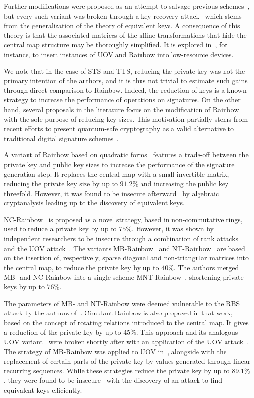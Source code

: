 \documentclass[english]{ufsc-thesis-rn46-2019/ufsc-thesis-rn46-2019}
\theoremstyle{definition}
\begin{document}
Further modifications were proposed as an attempt to salvage previous
schemes~\cite{Tsujii:201005}, but every such variant was broken through a key
recovery attack~\cite{Thomae:201207} which stems from the generalization of the
theory of equivalent keys. A consequence of this theory is that the associated
matrices of the affine transformations that hide the central map structure may
be thoroughly simplified. It is explored in~\cite{Czypek:201209}, for instance,
to insert instances of UOV and Rainbow into low-resource devices.

We note that in the case of STS and TTS, reducing the private key was not the
primary intention of the authors, and it is thus not trivial to estimate such
gains through direct comparison to Rainbow. Indeed, the reduction of keys is
a known strategy to increase the performance of operations on signatures. On
the other hand, several proposals in the literature focus on the modification
of Rainbow with the sole purpose of reducing key sizes. This motivation
partially stems from recent efforts to present quantum-safe cryptography as
a valid alternative to traditional digital signature
schemes~\cite{Bernstein:2008}.

A variant of Rainbow based on quadratic forms~\cite{Yasuda:201306} features
a trade-off between the private key and public key sizes to increase the
performance of the signature generation step. It replaces the central map with
a small invertible matrix, reducing the private key size by up to $91.2\%$ and
increasing the public key threefold. However, it was found to be insecure
afterward~\cite{Hashimoto:201601} by algebraic cryptanalysis leading up to the
discovery of equivalent keys.

NC-Rainbow~\cite{Yasuda:201202} is proposed as a novel strategy, based in
non-commutative rings, used to reduce a private key by up to $75\%$. However,
it was shown by independent researchers to be insecure through a combination of
rank attacks and the UOV attack~\cite{Thomae:201209,Hashimoto:201501}. The
variants MB-Rainbow~\cite{Yasuda:201305} and NT-Rainbow~\cite{Yasuda:201404}
are based on the insertion of, respectively, sparse diagonal and non-triangular
matrices into the central map, to reduce the private key by up to $40\%$. The
authors merged MB- and NC-Rainbow into a single scheme
MNT-Rainbow~\cite{Yasuda:201409}, shortening private keys by up to $76\%$.

The parameters of MB- and NT-Rainbow were deemed vulnerable to the RBS attack
by the authors of~\cite{Peng:201706}. Circulant Rainbow is also proposed in
that work, based on the concept of rotating relations introduced to the central
map. It gives a reduction of the private key by up to $45\%$. This approach and
its analogous UOV variant~\cite{Peng:201803} were broken shortly after with an
application of the UOV attack~\cite{Hashimoto:201903}. The strategy of
MB-Rainbow was applied to UOV in~\cite{Tan:201511}, alongside with the
replacement of certain parts of the private key by values generated through
linear recurring sequences. While these strategies reduce the private key by up
to $89.1\%$, they were found to be insecure~\cite{Park:201803} with the
discovery of an attack to find equivalent keys efficiently.
\end{document}
